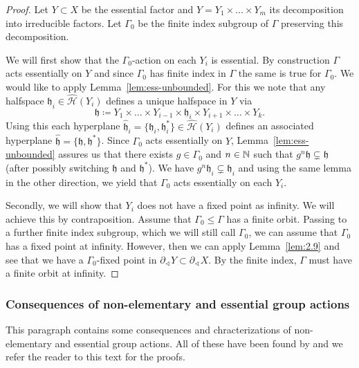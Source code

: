\begin{proof}
  Let \(Y \subset X\) be the essential factor and \(Y = Y_1 \times \dots \times Y_m\) its decomposition into irreducible factors. Let \(\Gamma_0\) be the finite index subgroup of \(\Gamma\) preserving this decomposition.

  We will first show that the \(\Gamma_0\)-action on each \(Y_i\) is essential. By construction \(\Gamma\) acts essentially on \(Y\) and since \(\Gamma_0\) has finite index in \(\Gamma\) the same is true for \(\Gamma_0\). We would like to apply Lemma~\ref{lem:ess-unbounded}. For this we note that any halfspace \(\mathfrak{h}_i \in \mathcal{\hat H}(Y_i)\) defines a unique halfspace in \(Y\) via
  \[
    \mathfrak{h} \coloneqq Y_1 \times \dots \times Y_{i-1} \times \mathfrak{h}_i \times Y_{i+1} \times \dots \times Y_k.
  \]
  Using this each hyperplane \(\mathfrak{\hat h}_i = \{\mathfrak{h}_i , \mathfrak{h}_i^\ast\} \in \mathcal{\hat H}(Y_i)\) defines an associated hyperplane \(\mathfrak{\hat h} = \{\mathfrak{h}, \mathfrak{h}^\ast\}\). Since \(\Gamma_0\) acts essentially on \(Y\), Lemma~\ref{lem:ess-unbounded} assures us that there exists \(g \in \Gamma_0\) and \(n \in \mathbb{N}\) such that \(g^n \mathfrak{h} \subsetneq \mathfrak{h}\) (after possibly switching \(\mathfrak{h}\) and \(\mathfrak{h}^\ast\)). We have \(g^n \mathfrak{h}_i \subsetneq \mathfrak{h}_i\) and using the same lemma in the other direction, we yield that \(\Gamma_0\) acts essentially on each \(Y_i\).

  Secondly, we will show that \(Y_i\) does not have a fixed point as infinity. We will achieve this by contraposition. Assume that \(\Gamma_0 \leq \Gamma\) has a finite orbit. Passing to a further finite index subgroup, which we will still call \(\Gamma_0\), we can assume that \(\Gamma_0\) has a fixed point at infinity. However, then we can apply Lemma~\ref{lem:2.9} and see that we have a \(\Gamma_0\)-fixed point in \(\partial_\sphericalangle Y \subset \partial_\sphericalangle X\). By the finite index, \(\Gamma\) must have a finite orbit at infinity.
\end{proof}

\subsubsection*{Consequences of non-elementary and essential group actions}
\label{cons-non-el-ess}

This paragraph contains some consequences and chracterizations of non-elementary and essential group actions. All of these have been found by \textcite{Caprace2010} and we refer the reader to this text for the proofs.

